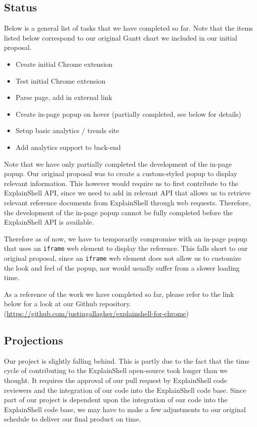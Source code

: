 \documentclass[11pt]{article}
\begin{document}
\subsection{Status}

Below is a general list of tasks that we have completed so far.
Note that the items listed below correspond to our original Gantt chart we
included in our initial proposal.
\begin{itemize}
  \item Create initial Chrome extension
  \item Test initial Chrome extension
  \item Parse page, add in external link
  \item Create in-page popup on hover (partially completed, see below
  for details)
  \item Setup basic analytics / trends site
  \item Add analytics support to back-end
\end{itemize}
Note that we have only partially completed the development of the in-page
popup. Our original proposal was to create a custom-styled popup to display
relevant information. This however would require us to first contribute to the
ExplainShell API, since we need to add in relevant API that allows us to
retrieve relevant reference documents from ExplainShell through web requests.
Therefore, the development of the in-page popup cannot be fully completed
before the ExplainShell API is available.

Therefore as of now, we have to temporarily compromise with an in-page popup
that uses an \texttt{iframe} web element to display the reference. This falls
short to our original proposal, since an \texttt{iframe} web element does not
allow us to customize the look and feel of the popup, nor would usually suffer
from a slower loading time.

As a reference of the work we have completed so far, please refer to the link
 below for a look at our Github repository.
(\url{https://github.com/justingallagher/explainshell-for-chrome})

\subsection{Projections}
Our project is slightly falling behind. This is partly due to the fact that
the time cycle of contributing to the ExplainShell open-source took longer
than we thought. It requires the approval of our pull request by
ExplainShell code reviewers and the
integration of our code into the ExplainShell code base. Since part of our
project is dependent upon the integration of our code into the ExplainShell
code base, we may have to make a few adjustments to our original schedule
to deliver our final product on time.
\end{document}
